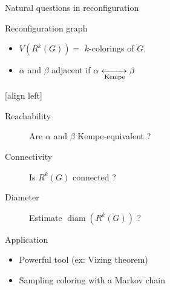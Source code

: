 \documentclass[11pt,xcolor=dvipsnames,presentation]{beamer}
\DeclareMathOperator{\diam}{diam}
\begin{document}
\begin{frame}{Natural questions in reconfiguration}
  \begin{exampleblock}{Reconfiguration graph}
    \begin{itemize}
    \item $V(R^k(G)) =$ $k$-colorings of $G$.
    \item $\alpha$ and $\beta$ adjacent  if $\alpha
      \xleftrightarrow[\text{Kempe}]{} \beta$
    \end{itemize}
  \end{exampleblock}

  [align left] 
  \begin{description}
  \item[Reachability] Are $\alpha$ and $\beta$ Kempe-equivalent ? 
  \item[Connectivity] Is $R^k(G)$ connected ?
  \item[Diameter] Estimate $\diam(R^k(G))$ ?
  \end{description}

  \begin{block}{Application}
    \begin{itemize}
    \item Powerful tool (ex: Vizing theorem)
    \item Sampling coloring with a Markov chain
    \end{itemize}
  \end{block}
\end{frame}
\end{document}
